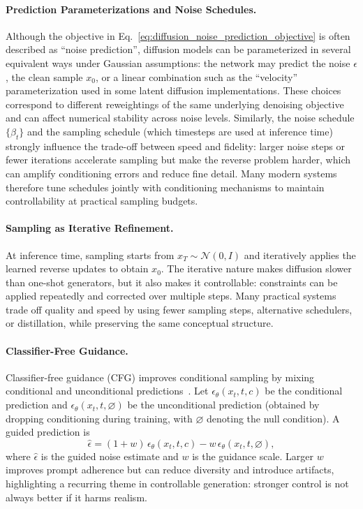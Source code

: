 \paragraph{Prediction Parameterizations and Noise Schedules.}
Although the objective in Eq.~\eqref{eq:diffusion_noise_prediction_objective} is often described as ``noise prediction'', diffusion models can be parameterized in several equivalent ways under Gaussian assumptions: the network may predict the noise $\epsilon$, the clean sample $x_0$, or a linear combination such as the ``velocity'' parameterization used in some latent diffusion implementations. These choices correspond to different reweightings of the same underlying denoising objective and can affect numerical stability across noise levels. Similarly, the noise schedule $\{\beta_t\}$ and the sampling schedule (which timesteps are used at inference time) strongly influence the trade-off between speed and fidelity: larger noise steps or fewer iterations accelerate sampling but make the reverse problem harder, which can amplify conditioning errors and reduce fine detail. Many modern systems~\citep{nichol2021improved,song2021denoising,karras2022elucidating,podell2023sdxl} therefore tune schedules jointly with conditioning mechanisms to maintain controllability at practical sampling budgets.

\paragraph{Sampling as Iterative Refinement.}
At inference time, sampling starts from $x_T\sim\mathcal{N}(0,I)$ and iteratively applies the learned reverse updates to obtain $x_0$. The iterative nature makes diffusion slower than one-shot generators, but it also makes it controllable: constraints can be applied repeatedly and corrected over multiple steps. Many practical systems trade off quality and speed by using fewer sampling steps, alternative schedulers, or distillation, while preserving the same conceptual structure.

\paragraph{Classifier-Free Guidance.}
Classifier-free guidance (CFG) improves conditional sampling by mixing conditional and unconditional predictions~\citep{ho2022classifier}. Let $\epsilon_\theta(x_t,t,c)$ be the conditional prediction and $\epsilon_\theta(x_t,t,\varnothing)$ be the unconditional prediction (obtained by dropping conditioning during training, with $\varnothing$ denoting the null condition). A guided prediction is
\begin{equation}
\hat\epsilon = (1+w)\,\epsilon_\theta(x_t,t,c) - w\,\epsilon_\theta(x_t,t,\varnothing),
\end{equation}
where $\hat\epsilon$ is the guided noise estimate and $w$ is the guidance scale. Larger $w$ improves prompt adherence but can reduce diversity and introduce artifacts, highlighting a recurring theme in controllable generation: stronger control is not always better if it harms realism.

